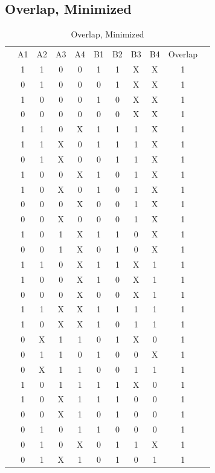 \documentclass[letterpaper,titlepage,oneside]{article}
\begin{document}
\pagebreak
\subsection*{Overlap, Minimized}

\begin{center}
\begin{table}['h']
\begin{tabular}{c|c|c|c|c|c|c|c|c|c|c}
\cline{2-10}
 & A1 & A2 & A3 & A4 & B1 & B2 & B3 & B4 & Overlap &  \\ \cline{2-10}
 & 1 & 1 & 0 & 0 & 1 & 1 & X & X & 1 &  \\
 & 0 & 1 & 0 & 0 & 0 & 1 & X & X & 1 &  \\
 & 1 & 0 & 0 & 0 & 1 & 0 & X & X & 1 &  \\
 & 0 & 0 & 0 & 0 & 0 & 0 & X & X & 1 &  \\
 & 1 & 1 & 0 & X & 1 & 1 & 1 & X & 1 &  \\
 & 1 & 1 & X & 0 & 1 & 1 & 1 & X & 1 &  \\
 & 0 & 1 & X & 0 & 0 & 1 & 1 & X & 1 &  \\
 & 1 & 0 & 0 & X & 1 & 0 & 1 & X & 1 &  \\
 & 1 & 0 & X & 0 & 1 & 0 & 1 & X & 1 &  \\
 & 0 & 0 & 0 & X & 0 & 0 & 1 & X & 1 &  \\
 & 0 & 0 & X & 0 & 0 & 0 & 1 & X & 1 &  \\
 & 1 & 0 & 1 & X & 1 & 1 & 0 & X & 1 &  \\
 & 0 & 0 & 1 & X & 0 & 1 & 0 & X & 1 &  \\
 & 1 & 1 & 0 & X & 1 & 1 & X & 1 & 1 &  \\
 & 1 & 0 & 0 & X & 1 & 0 & X & 1 & 1 &  \\
 & 0 & 0 & 0 & X & 0 & 0 & X & 1 & 1 &  \\
 & 1 & 1 & X & X & 1 & 1 & 1 & 1 & 1 &  \\
 & 1 & 0 & X & X & 1 & 0 & 1 & 1 & 1 &  \\
 & 0 & X & 1 & 1 & 0 & 1 & X & 0 & 1 &  \\
 & 0 & 1 & 1 & 0 & 1 & 0 & 0 & X & 1 &  \\
 & 0 & X & 1 & 1 & 0 & 0 & 1 & 1 & 1 &  \\
 & 1 & 0 & 1 & 1 & 1 & 1 & X & 0 & 1 &  \\
 & 1 & 0 & X & 1 & 1 & 1 & 0 & 0 & 1 &  \\
 & 0 & 0 & X & 1 & 0 & 1 & 0 & 0 & 1 &  \\
 & 0 & 1 & 0 & 1 & 1 & 0 & 0 & 0 & 1 &  \\
 & 0 & 1 & 0 & X & 0 & 1 & 1 & X & 1 &  \\
 & 0 & 1 & X & 1 & 0 & 1 & 0 & 1 & 1 &  \\
\cline{2-10}
\end{tabular}
\caption{Overlap, Minimized}\label{table:Overlap_Minimized}
\end{table}
\end{center}
\pagebreak
\end{document}
